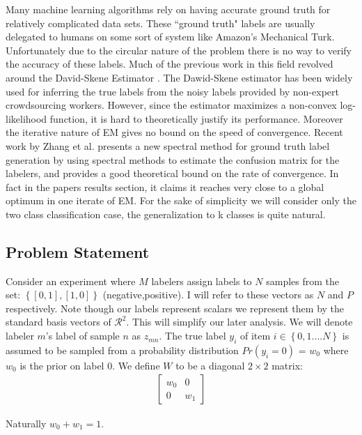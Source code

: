     Many machine learning algorithms rely on having accurate ground truth for relatively complicated data sets. These ``ground truth" labels are usually delegated to humans on some sort of system like Amazon's Mechanical Turk. Unfortunately due to the circular nature of the problem there is no way to verify the accuracy of these labels. Much of the previous work in this field revolved around the David-Skene Estimator \cite{dawid1979maximum}. The Dawid-Skene estimator has been widely used for inferring the true labels from the noisy labels provided by non-expert crowdsourcing workers. However, since the estimator maximizes a non-convex log-likelihood function, it is hard to theoretically justify its performance. Moreover the iterative nature of EM gives no bound on the speed of convergence.  Recent work by Zhang et al. \cite{zhang2014spectral} presents a new spectral method for ground truth label generation by using spectral methods to estimate the confusion matrix for the labelers, and provides a good theoretical bound on the rate of convergence. In fact in the papers results section, it claims it reaches very close to a global optimum in one iterate of EM. For the sake of simplicity we will consider only the two class classification case, the generalization to k classes is quite natural.

\subsection{Problem Statement}
Consider an experiment where $M$ labelers assign labels to $N$ samples from the set: $\left\{[0,1],[1,0]\right\}$ (negative,positive). I will refer to these vectors as $N$ and $P$ respectively. Note though our labels represent scalars we represent them by the standard basis vectors of $\mathcal{R}^{2}$. This will simplify our later analysis. We will denote labeler $m$'s label of sample $n$ as $z_{mn}$. The true label $y_{i}$ of item
$i \in \left\{0,1....N\right\} $ is assumed to be sampled from a probability
distribution $Pr(y_{i} = 0)$ = $w_{0}$ where $w_{0}$ is the prior on label 0.  We define $W$ to be a diagonal $2 \times 2$ matrix:
\begin{align}
\begin{bmatrix}
w_{0} & 0 \\
0     & w_{1}
\end{bmatrix}
\end{align}

Naturally $w_{0} + w_{1} = 1$. \\


